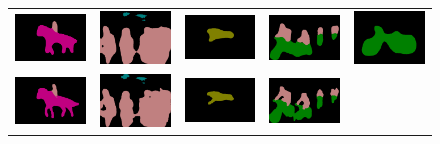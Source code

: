 \begin{figure}[ht]
  \centering
  \begin{tabular}{c c c c c}
    \includegraphics[height=0.11\linewidth]{fig/boundary_refine/vgg128noup_2007_003022.png} &
    \includegraphics[height=0.11\linewidth]{fig/boundary_refine/vgg128noup_2007_001284.png} &
    \includegraphics[height=0.11\linewidth]{fig/boundary_refine/vgg128noup_2007_001289.png} &
    \includegraphics[height=0.11\linewidth]{fig/boundary_refine/vgg128noup_2007_001311.png} &
    \includegraphics[height=0.11\linewidth]{fig/boundary_refine/vgg128noup_2009_000573.png} \\
    \includegraphics[height=0.11\linewidth]{fig/boundary_refine/vgg128ms_2007_003022.png} &
    \includegraphics[height=0.11\linewidth]{fig/boundary_refine/vgg128ms_2007_001284.png} &
    \includegraphics[height=0.11\linewidth]{fig/boundary_refine/vgg128ms_2007_001289.png} &
    \includegraphics[height=0.11\linewidth]{fig/boundary_refine/vgg128ms_2007_001311.png} &

\end{tabular}
\end{figure}
